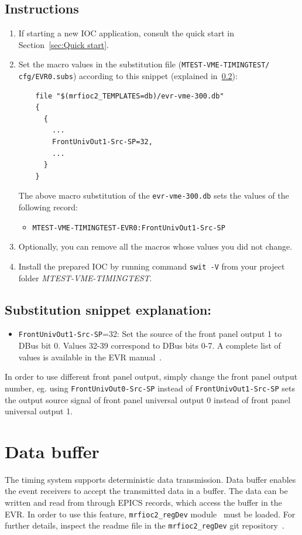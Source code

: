 \documentclass[12pt,a4paper]{article}
\begin{document}
\subsection{Instructions}
\begin{enumerate}
	\item If starting a new IOC application, consult the quick start in Section~\ref{sec:Quick start}.
	
	\item Set the macro values in the substitution file (\texttt{MTEST-VME-TIMINGTEST/} \texttt{cfg/EVR0.subs}) according to this snippet (explained in~\ref{sec:explain_dbus}):
\begin{verbatim}
	file "$(mrfioc2_TEMPLATES=db)/evr-vme-300.db"
	{
	  {
	    ...
	    FrontUnivOut1-Src-SP=32,
	    ...
	  }
	}
\end{verbatim}
	The above macro substitution of the \texttt{evr-vme-300.db} sets the values of the following record:
	\begin{itemize}
		\item \texttt{MTEST-VME-TIMINGTEST-EVR0:FrontUnivOut1-Src-SP}
	\end{itemize}

	\item Optionally, you can remove all the macros whose values you did not change. 
	\item Install the prepared IOC by running command \texttt{swit -V} from your project folder \textit{MTEST-VME-TIMINGTEST}.
\end{enumerate}

\subsection{Substitution snippet explanation:}\label{sec:explain_dbus}
\begin{itemize}
	\item \texttt{FrontUnivOut1-Src-SP}=32: Set the source of the front panel output 1  to DBus bit 0. Values 32-39 correspond to DBus bits 0-7. A complete list of values is available in the EVR manual~\cite{evr_manual}.
\end{itemize}

In order to use different front panel output, simply change the front panel output number, eg. using \texttt{FrontUnivOut0-Src-SP} instead of \texttt{FrontUnivOut1-Src-SP} sets the output source signal of front panel universal output 0 instead of front panel universal output 1.

\section{Data buffer}\label{sec:data_buffer}
The timing system supports deterministic data transmission. Data buffer enables the event receivers to accept the transmitted data in a buffer. The data can be written and read from through EPICS records, which access the buffer in the EVR. In order to use this feature, \texttt{mrfioc2\_regDev} module~\cite{git_mrfioc2_regDev} must be loaded. For further details, inspect the readme file in the \texttt{mrfioc2\_regDev} git repository~\cite{git_mrfioc2_regDev}.
\end{document}
